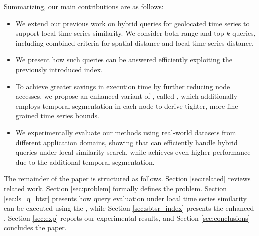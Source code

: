 Summarizing, our main contributions are as follows:

\begin{itemize}
 \item We extend our previous work on hybrid queries for geolocated time series to support local time series similarity. We consider both range and top-$k$ queries, including combined criteria for spatial distance and local time series distance.
 \item We present how such queries can be answered efficiently exploiting the previously introduced \btsr index.
 \item To achieve greater savings in execution time by further reducing node accesses, we propose an enhanced variant of \btsr, called \sbtsr, which additionally employs temporal segmentation in each node to derive tighter, more fine-grained time series bounds.
 \item We experimentally evaluate our methods using real-world datasets from different application domains, showing that \btsr can efficiently handle hybrid queries under local similarity search, while \sbtsr achieves even higher performance due to the additional temporal segmentation.
\end{itemize}

The remainder of the paper is structured as follows. Section \ref{sec:related} reviews related work. Section \ref{sec:problem} formally defines the problem. Section \ref{sec:ls_q_btsr} presents how query evaluation under local time series similarity can be executed using the \btsr, while Section \ref{sec:sbtsr_index} presents the enhanced \sbtsr. Section \ref{sec:exp} reports our experimental results, and Section \ref{sec:conclusions} concludes the paper.




